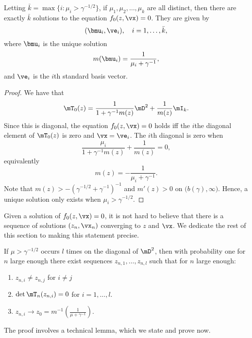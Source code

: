 \begin{lemma}
    Letting $\bar k = \max \{ i : \mu_i > \gamma^{-1/2} \}$, if $\mu_1, \mu_2, 
    \ldots, \mu_k$ are all distinct, then there are exactly
    $\bar k$ solutions to the equation $f_0( z, \vx ) = 0$.  They are given
    by
    \[
        ( \bmu_i, \ve_i ), \quad \text{$i = 1, \ldots, \bar k$},
    \]
    where $\bmu_i$ is the unique solution
    \[
        m( \bmu_i ) = \frac{1}{\mu_i + \gamma^{-1}},
    \]
    and $\ve_i$ is the $i$th standard basis vector.
\end{lemma}
\begin{proof}
    We have that 
    \[
        \mT_0(z) 
        = 
        \frac{1}{1 + \gamma^{-1} m(z)} \mD^2 
        + 
        \frac{1}{m(z)} \mI_k.
    \]
    Since this is diagonal, the equation $f_0(z, \vx) = 0$ holds iff the 
    $i$the diagonal element of $\mT_0(z)$ is zero and $\vx = \ve_i$.  The 
    $i$th diagonal is zero when 
    \[
        \frac{\mu_i}{1 + \gamma^{-1} m(z)} + \frac{1}{m(z)} = 0,
    \]
    equivalently
    \[
        m(z) = - \frac{1}{\mu_i + \gamma^{-1}}.
    \]
    Note that $m(z) > - \left( \gamma^{-1/2} + \gamma^{-1} \right)^{-1}$ and
    $m'(z) > 0$ on $\big( b(\gamma), \infty \big)$.  Hence, a unique solution
    only exists when $\mu_i > \gamma^{-1/2}$.
\end{proof}

Given a solution of $f_0(z, \vx) = 0$, it is not hard to believe that there is a sequence of solutions $(z_n, \vx_n)$ converging to $z$ and $\vx$.  We dedicate the rest of this section to making this statement precise.  

\begin{lemma}\label{L:zn-sequence-exists}
    If $\mu > \gamma^{-1/2}$ occurs $l$ times on the diagonal of $\mD^2$, then
    with probability one for $n$ large enough there exist sequences $z_{n,1}, 
    \ldots, z_{n,l}$ such that for $n$ large enough:
    \begin{enumerate}
        \item $z_{n,i} \neq z_{n,j}$ for $i \neq j$
        \item $\det \mT_n(z_{n,i}) = 0$ for $i = 1, \ldots, l$.
        \item $z_{n,i} \to 
                z_0 
                = 
                m^{-1} \left( \frac{1}{\mu + \gamma^{-1}} \right)$.
    \end{enumerate}
\end{lemma}

The proof involves a technical lemma, which we state and prove now.

